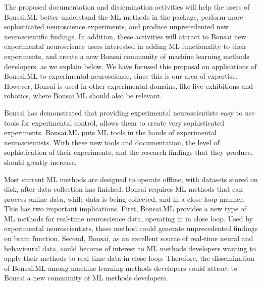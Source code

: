 The proposed documentation and dissemination activities will help the users of
Bonsai.ML better understand the ML methods in the package, perform more
sophisticated neuroscience experiments, and produce unprecedented new
neuroscientific findings.
%
In addition, these activities will attract to Bonsai new experimental
neuroscience users interested in adding ML functionality to their experiments,
and create a new Bonsai community of machine learning methods developers, as we
explain below.
%
We have focused this proposal on applications of Bonsai.ML to experimental
neuroscience, since this is our area of expertise. However, Bonsai is used in
other experimental domains, like live exhibitions and robotics, where Bonsai.ML
should also be relevant.

Bonsai has demonstrated that providing experimental neuroscientists easy to use
tools for experimental control, allows them to create very sophisticated
experiments.
%
Bonsai.ML puts ML tools in the hands of experimental neuroscientists. With
these new tools and documentation, the level of sophistication of their
experiments, and the research findings that they produce, should greatly increase.

Most current ML methods are designed to operate offline, with datasets stored
on disk, after data collection has finished.
%
Bonsai requires ML methods that can process online data, while data is being
collected, and in a close-loop manner.
%
This has two important implications.
%
First, Bonsai.ML provides a new type of ML methods for real-time neuroscience
data, operating in in close loop. Used by experimental neuroscientists, these
method could generate unprecedented findings on brain function.
%
Second, Bonsai, as an excellent source of real-time neural and behavioural data,
could become of interest to ML methods developers wanting to apply their
methods to real-time data in close loop.
%
Therefore, the dissemination of Bonsai.ML among machine learning methods
developers could attract to Bonsai a new community of ML methods developers.
